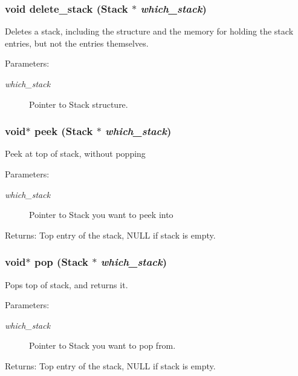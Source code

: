 \subsubsection{\setlength{\rightskip}{0pt plus 5cm}void delete\_\-stack (\bf{Stack} $\ast$ {\em which\_\-stack})}\label{stack_8c_51a8e7dcd59c4eeacab0a6fcbd9779f0}


Deletes a stack, including the structure and the memory for holding the stack entries, but not the entries themselves. \begin{Desc}
\item[Parameters:]
\begin{description}
\item[{\em which\_\-stack}]Pointer to Stack structure. \end{description}
\end{Desc}
\subsubsection{\setlength{\rightskip}{0pt plus 5cm}void$\ast$ peek (\bf{Stack} $\ast$ {\em which\_\-stack})}\label{stack_8c_75f168a88a2f0eb5054b9eb571b3dd77}


Peek at top of stack, without popping \begin{Desc}
\item[Parameters:]
\begin{description}
\item[{\em which\_\-stack}]Pointer to Stack you want to peek into \end{description}
\end{Desc}
\begin{Desc}
\item[Returns:]Top entry of the stack, NULL if stack is empty. \end{Desc}
\subsubsection{\setlength{\rightskip}{0pt plus 5cm}void$\ast$ pop (\bf{Stack} $\ast$ {\em which\_\-stack})}\label{stack_8c_d02fd402bed8958596a341fbef57f0a7}


Pops top of stack, and returns it. \begin{Desc}
\item[Parameters:]
\begin{description}
\item[{\em which\_\-stack}]Pointer to Stack you want to pop from. \end{description}
\end{Desc}
\begin{Desc}
\item[Returns:]Top entry of the stack, NULL if stack is empty. \end{Desc}
